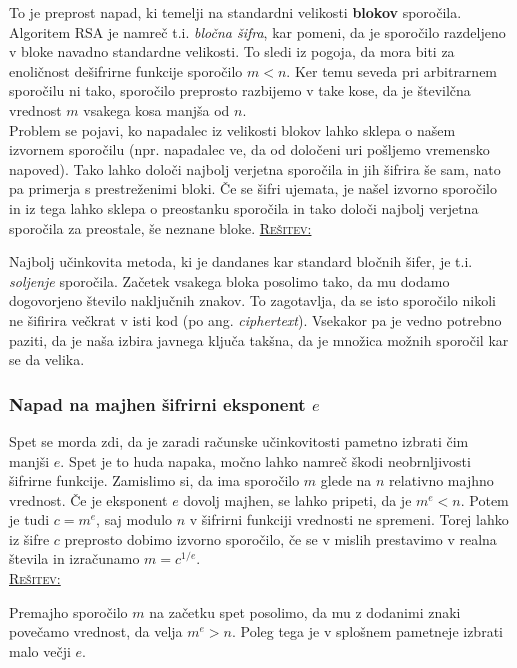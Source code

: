 \documentclass[a4paper, 12pt]{article} %
\newenvironment{matematika}[1]{
\textcolor{bostonuniversityred}{\underline{\textsc{#1:}}}
}{
}
\begin{document}
To je preprost napad, ki temelji na standardni velikosti \textbf{blokov} sporočila. Algoritem RSA je namreč t.i. \emph{bločna šifra}, kar pomeni, da je sporočilo razdeljeno v bloke navadno standardne velikosti. To sledi iz pogoja, da mora biti za enoličnost dešifrirne funkcije sporočilo $m < n$. Ker temu seveda pri arbitrarnem sporočilu ni tako, sporočilo preprosto razbijemo v take kose, da je številčna vrednost $m$ vsakega kosa manjša od $n$. \\
Problem se pojavi, ko napadalec iz velikosti blokov lahko sklepa o našem izvornem sporočilu (npr. napadalec ve, da od določeni uri pošljemo vremensko napoved). Tako lahko določi najbolj verjetna sporočila in jih šifrira še sam, nato pa primerja s prestreženimi bloki. Če se šifri ujemata, je našel izvorno sporočilo in iz tega lahko sklepa o preostanku sporočila in tako določi najbolj verjetna sporočila za preostale, še neznane bloke.
\newline
\newline
\begin{matematika}{Rešitev}
Najbolj učinkovita metoda, ki je dandanes kar standard bločnih šifer, je t.i. \emph{soljenje} sporočila. Začetek vsakega bloka posolimo tako, da mu dodamo dogovorjeno število naključnih znakov. To zagotavlja, da se isto sporočilo nikoli ne šifirira večkrat v isti kod (po ang. \emph{ciphertext}). Vsekakor pa je vedno potrebno paziti, da je naša izbira javnega ključa takšna, da je množica možnih sporočil kar se da velika.
\end{matematika}

\subsubsection{Napad na majhen šifrirni eksponent $e$}

Spet se morda zdi, da je zaradi računske učinkovitosti pametno izbrati čim manjši $e$. Spet je to huda napaka, močno lahko namreč škodi neobrnljivosti šifrirne funkcije.
\newline
\newline
Zamislimo si, da ima sporočilo $m$ glede na $n$ relativno majhno vrednost. Če je eksponent $e$ dovolj majhen, se lahko pripeti, da je $m^e < n$. Potem je tudi $c = m^e$, saj modulo $n$ v šifrirni funkciji vrednosti ne spremeni. Torej lahko iz šifre $c$ preprosto dobimo izvorno sporočilo, če se v mislih prestavimo v realna števila in izračunamo $m = c^{1/e}$. \\

\begin{matematika}{Rešitev}
Premajho sporočilo $m$ na začetku spet posolimo, da mu z dodanimi znaki povečamo vrednost, da velja $m^e > n$. Poleg tega je v splošnem pametneje izbrati malo večji $e$.
\end{matematika}
\end{document}
